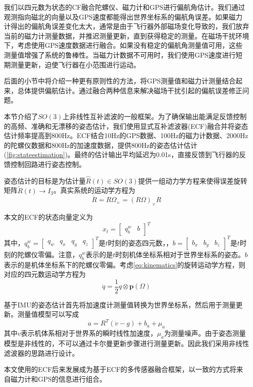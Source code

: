 \documentclass[
  type=master
]{gdutthesis}
\begin{document}
我们以四元数为状态的CF融合陀螺仪、磁力计和GPS进行偏航角估计。我们通过观测指向磁北的向量以及GPS速度都能得出世界坐标系的偏航角误差。如果磁力计得出的偏航角误差变化太大，通常是由于飞行器外部磁场变化导致的，我们放弃当前的磁力计测量数据，并推迟测量更新，直到获得稳定的测量。在磁场干扰环境下，考虑使用GPS速度数据进行融合。如果没有稳定的偏航角测量值可用，这些测量值增强了系统的鲁棒性。当磁力计数据不可用时，我们使用GPS速度进行短期测量更新，迫使飞行器在小范围进行运动。\par
后面的小节中将介绍一种更有原则性的方法，将GPS测量值和磁力计测量结合起来，总体提供偏航估计。通过融合两种信息来解决磁场干扰引起的偏航误差修正问题。

本节介绍了$SO(3)$上非线性互补滤波的一般框架。为了确保输出能满足反馈控制的高频、准确和无漂移的姿态估计，我们使用显式互补滤波器(ECF)融合并将姿态估计频率提高到800Hz。ECF结合10Hz的GPS数据、100Hz的磁力计数据、2000Hz的陀螺仪数据和800Hz的加速度数据，提供800Hz的姿态估计估计(\autoref{fig:stateestimation})。最终的估计输出平均延迟为0.01s，直接反馈到飞行器的反馈控制回路进行姿态控制。
\par
姿态估计的目标是为估计量$\hat{R}(t)\in SO(3)$提供一组动力学方程来使得误差旋转矩阵$\widetilde{R}(t)\rightarrow I_3$。真实系统的运动学方程为
\begin{equation}\label{eq:kinematics}
	\dot{R}=R\Omega_{\times}=(R\Omega)_{\times}R
\end{equation}\par

本文的ECF的状态向量定义为
\begin{equation}\label{eq:statevector}
	x_{t}=
\begin{bmatrix}
	q_{b}^{w} & b
\end{bmatrix}^T
\end{equation}
其中，$q_{b}^{w}=\begin{bmatrix}
	q_w & q_x & q_y & q_z
\end{bmatrix}^T$是$t$时刻的姿态四元数，，$b=\begin{bmatrix}
 b_x & b_y & b_z
\end{bmatrix}^T$是$t$时刻的陀螺仪零偏。注意，$q_{b}^{w}$表示的是$t$时刻机体坐标系相对于世界坐标系的姿态。$b$表示的是机体坐标系下的陀螺仪零偏。考虑\autoref{eq:kinematics}的旋转运动学方程，则对应的四元数运动学方程为
\begin{equation}\label{eq:quatkinematics}
	\dot{q}=\frac{1}{2}q\otimes \mathbf{p}(\Omega)
\end{equation}\par
基于IMU的姿态估计首先将加速度计测量值转换为世界坐标系，然后用于测量更新。测量值模型可以写成
\begin{equation}\label{eq:measurementmodel}
	a=R^T(\dot{v}-g)+b_a+\mu_a
\end{equation}
其中$v$表示机体系相对于世界系的瞬时线性加速度，$\mu_a$为测量噪声。由于姿态测量模型是非线性的，不可以通过卡尔曼更新步骤进行测量更新。因此我们采用非线性滤波器的思路进行设计。\par
本文使用的ECF后来发展成为基于ECF的多传感器融合框架，以一致的方式将来自磁力计和GPS的信息进行组合。
\end{document}
